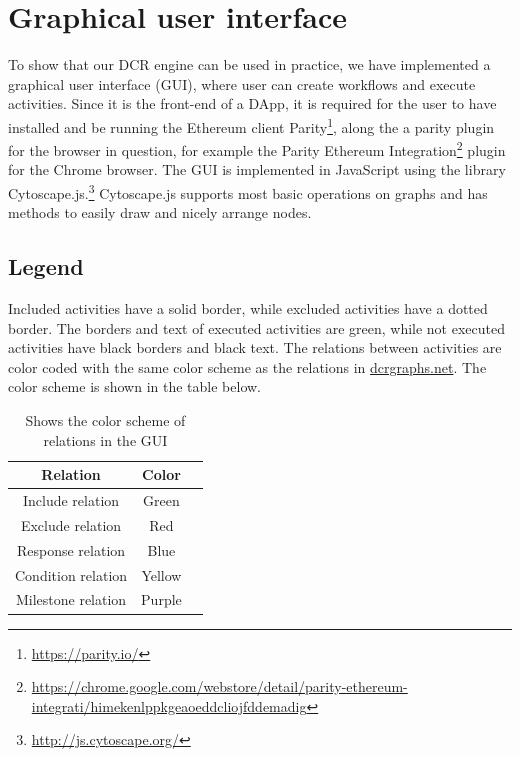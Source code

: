 \documentclass{article}
\begin{document}
	\section{Graphical user interface}
	\label{sec:gui}
	To show that our DCR engine can be used in practice, we have implemented a graphical user interface (GUI), where user can create workflows and execute activities.
	Since it is the front-end of a DApp, it is required for the user to have installed and be running the Ethereum client Parity\footnote{\url{https://parity.io/}}, along the a parity plugin for the browser in question, for example the Parity Ethereum Integration\footnote{\url{https://chrome.google.com/webstore/detail/parity-ethereum-integrati/himekenlppkgeaoeddcliojfddemadig}} plugin for the Chrome browser. 
	The GUI is implemented in JavaScript using the library Cytoscape.js.\footnote{\url{http://js.cytoscape.org/}}
	Cytoscape.js supports most basic operations on graphs and has methods to easily draw and nicely arrange nodes.

		\subsection{Legend}
		Included activities have a solid border, while excluded activities have a dotted border. 
		The borders and text of executed activities are green, while not executed activities have black borders and black text.
		The relations between activities are color coded with the same color scheme as the relations in \href{http://www.dcrgraphs.net}{dcrgraphs.net}. The color scheme is shown in the table below.

		\begin{table}[!ht]
			\label{table:relation-color}
			\centering
			\begin{tabular}{|c|c|c|}
			\hline
			\textbf{Relation} 	& \textbf{Color} \\ \hline
			Include relation    & Green \\\hline
			Exclude relation    & Red \\\hline
			Response relation   & Blue \\\hline
			Condition relation  & Yellow \\\hline
			Milestone relation  & Purple \\\hline
			\end{tabular}
			\caption{Shows the color scheme of relations in the GUI}
		\end{table}
\end{document}
